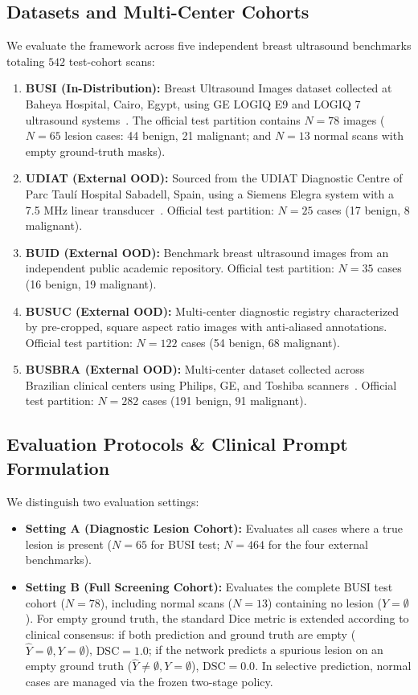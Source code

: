 \documentclass[10pt,journal,compsoc]{IEEEtran}
\begin{document}
\subsection{Datasets and Multi-Center Cohorts}
We evaluate the framework across five independent breast ultrasound benchmarks totaling $542$ test-cohort scans:
\begin{enumerate}
    \item \textbf{BUSI (In-Distribution):} Breast Ultrasound Images dataset collected at Baheya Hospital, Cairo, Egypt, using GE LOGIQ E9 and LOGIQ 7 ultrasound systems~\cite{al2020dataset}. The official test partition contains $N=78$ images ($N=65$ lesion cases: 44 benign, 21 malignant; and $N=13$ normal scans with empty ground-truth masks).
    \item \textbf{UDIAT (External OOD):} Sourced from the UDIAT Diagnostic Centre of Parc Taulí Hospital Sabadell, Spain, using a Siemens Elegra system with a 7.5 MHz linear transducer~\cite{yap2017automated}. Official test partition: $N=25$ cases (17 benign, 8 malignant).
    \item \textbf{BUID (External OOD):} Benchmark breast ultrasound images from an independent public academic repository. Official test partition: $N=35$ cases (16 benign, 19 malignant).
    \item \textbf{BUSUC (External OOD):} Multi-center diagnostic registry characterized by pre-cropped, square aspect ratio images with anti-aliased annotations. Official test partition: $N=122$ cases (54 benign, 68 malignant).
    \item \textbf{BUSBRA (External OOD):} Multi-center dataset collected across Brazilian clinical centers using Philips, GE, and Toshiba scanners~\cite{gomezflores2024busbra}. Official test partition: $N=282$ cases (191 benign, 91 malignant).
\end{enumerate}

\subsection{Evaluation Protocols \& Clinical Prompt Formulation}
We distinguish two evaluation settings:
\begin{itemize}
    \item \textbf{Setting A (Diagnostic Lesion Cohort):} Evaluates all cases where a true lesion is present ($N=65$ for BUSI test; $N=464$ for the four external benchmarks).
    \item \textbf{Setting B (Full Screening Cohort):} Evaluates the complete BUSI test cohort ($N=78$), including normal scans ($N=13$) containing no lesion ($Y = \emptyset$). For empty ground truth, the standard Dice metric is extended according to clinical consensus: if both prediction and ground truth are empty ($\hat{Y} = \emptyset, Y = \emptyset$), $\mathrm{DSC} = 1.0$; if the network predicts a spurious lesion on an empty ground truth ($\hat{Y} \neq \emptyset, Y = \emptyset$), $\mathrm{DSC} = 0.0$. In selective prediction, normal cases are managed via the frozen two-stage policy.
\end{itemize}
\end{document}
